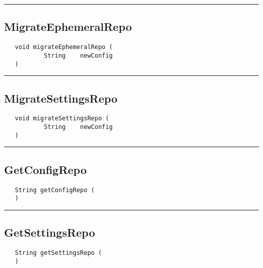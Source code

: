 \rule{15cm}{2pt}
\subsection{MigrateEphemeralRepo}
\label{Api:MigrateEphemeralRepo}
\begin{verbatim}
   void migrateEphemeralRepo (
           String    newConfig
   )
\end{verbatim}



\rule{15cm}{2pt}
\subsection{MigrateSettingsRepo}
\label{Api:MigrateSettingsRepo}
\begin{verbatim}
   void migrateSettingsRepo (
           String    newConfig
   )
\end{verbatim}



\rule{15cm}{2pt}
\subsection{GetConfigRepo}
\label{Api:GetConfigRepo}
\begin{verbatim}
   String getConfigRepo (
   )
\end{verbatim}



\rule{15cm}{2pt}
\subsection{GetSettingsRepo}
\label{Api:GetSettingsRepo}
\begin{verbatim}
   String getSettingsRepo (
   )
\end{verbatim}



